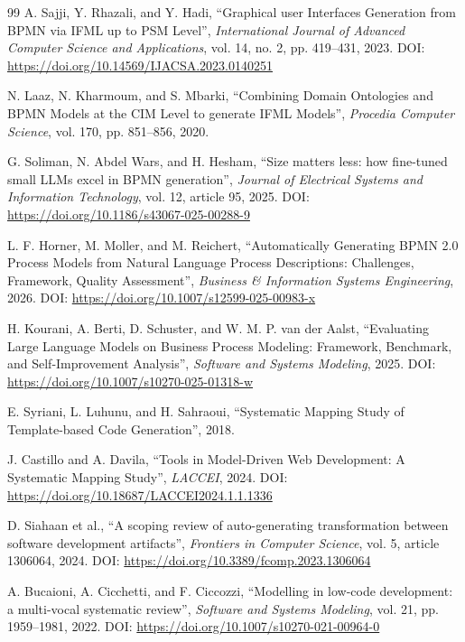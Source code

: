 \documentclass[12pt,a4paper]{article}
\begin{document}
\begin{thebibliography}{99}
A. Sajji, Y. Rhazali, and Y. Hadi, ``Graphical user Interfaces Generation from BPMN via IFML up to PSM Level'', \textit{International Journal of Advanced Computer Science and Applications}, vol. 14, no. 2, pp. 419--431, 2023. DOI: \url{https://doi.org/10.14569/IJACSA.2023.0140251}

N. Laaz, N. Kharmoum, and S. Mbarki, ``Combining Domain Ontologies and BPMN Models at the CIM Level to generate IFML Models'', \textit{Procedia Computer Science}, vol. 170, pp. 851--856, 2020.

G. Soliman, N. Abdel Wars, and H. Hesham, ``Size matters less: how fine-tuned small LLMs excel in BPMN generation'', \textit{Journal of Electrical Systems and Information Technology}, vol. 12, article 95, 2025. DOI: \url{https://doi.org/10.1186/s43067-025-00288-9}

L. F. Horner, M. Moller, and M. Reichert, ``Automatically Generating BPMN 2.0 Process Models from Natural Language Process Descriptions: Challenges, Framework, Quality Assessment'', \textit{Business \& Information Systems Engineering}, 2026. DOI: \url{https://doi.org/10.1007/s12599-025-00983-x}

H. Kourani, A. Berti, D. Schuster, and W. M. P. van der Aalst, ``Evaluating Large Language Models on Business Process Modeling: Framework, Benchmark, and Self-Improvement Analysis'', \textit{Software and Systems Modeling}, 2025. DOI: \url{https://doi.org/10.1007/s10270-025-01318-w}

E. Syriani, L. Luhunu, and H. Sahraoui, ``Systematic Mapping Study of Template-based Code Generation'', 2018.

J. Castillo and A. Davila, ``Tools in Model-Driven Web Development: A Systematic Mapping Study'', \textit{LACCEI}, 2024. DOI: \url{https://doi.org/10.18687/LACCEI2024.1.1.1336}

D. Siahaan et al., ``A scoping review of auto-generating transformation between software development artifacts'', \textit{Frontiers in Computer Science}, vol. 5, article 1306064, 2024. DOI: \url{https://doi.org/10.3389/fcomp.2023.1306064}

A. Bucaioni, A. Cicchetti, and F. Ciccozzi, ``Modelling in low-code development: a multi-vocal systematic review'', \textit{Software and Systems Modeling}, vol. 21, pp. 1959--1981, 2022. DOI: \url{https://doi.org/10.1007/s10270-021-00964-0}


\end{thebibliography}
\end{document}
